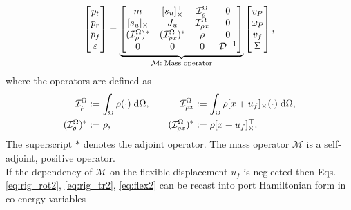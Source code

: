 \begin{equation}
\label{eq:mass_op}
\begin{bmatrix}
p_t \\ p_r \\ p_f \\ \varepsilon \\
\end{bmatrix} = 
\underbrace{\begin{bmatrix}
	m & \crmat{s_u}^\top & \mathcal{I}_\rho^{\Omega} & 0 \\
	\crmat{s_u} & J_u & \mathcal{I}_{\rho x}^{\Omega} & 0  \\
	(\mathcal{I}_\rho^{\Omega})^* & (\mathcal{I}_{\rho x}^{\Omega})^* & \rho & 0  \\
	0 & 0 & 0 & {\mathcal{D}}^{-1} \\
	\end{bmatrix}}_{\mathcal{M}: \; \text{Mass operator}}
\begin{bmatrix}
v_P \\ \omega_P  \\ v_f  \\ \Sigma \\
\end{bmatrix},
\end{equation}
where the operators are defined as
\begin{equation*}
\begin{aligned}
\mathcal{I}_\rho^\Omega &:=\int_{\Omega} \rho (\cdot) \d{\Omega}, \\
(\mathcal{I}_\rho^{\Omega})^* &:= \rho, \\
\end{aligned} \qquad
\begin{aligned} 
\mathcal{I}_{\rho x}^{\Omega} &:= \int_\Omega \rho \crmat{x+u_f} (\cdot) \d{\Omega}, \\
(\mathcal{I}_{\rho x}^{\Omega})^* &:= \rho \crmat{x+u_f}^\top. \\
\end{aligned}
\end{equation*}
The superscript $*$ denotes the adjoint operator. The mass operator $\mathcal{M}$ is a self-adjoint, positive operator. \\
If the dependency of $\mathcal{M}$ on the flexible displacement $u_f$ is neglected then Eqs. \eqref{eq:rig_rot2}, \eqref{eq:rig_tr2}, \eqref{eq:flex2} can be recast into port Hamiltonian form in co-energy variables
